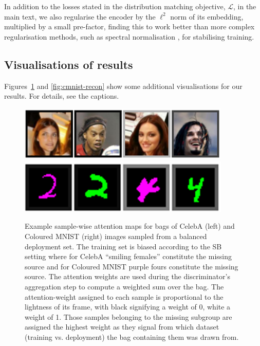 In addition to the losses stated in the distribution matching objective, $\mathcal{L}$, in the main text, we also regularise the encoder by the $\ell^2$ norm of its embedding, multiplied by a small pre-factor, finding this to work better than more complex regularisation methods, such as spectral normalisation \citep{miyato2018spectral}, for stabilising training.

\subsection{Visualisations of results}\label{sec:qual-results}
Figures~\ref{fig:attn_maps} and \ref{fig:cmnist-recon} show some additional visualisations for our results.
For details, see the captions.
\begin{figure}[tb]
  \centering
    \includegraphics[width=0.9\textwidth]{paper3/figures/celeba_attn_map.png}
    \includegraphics[width=0.9\textwidth]{paper3/figures/cmnist_attn_map.png}
  \caption{
    Example sample-wise attention maps for bags of CelebA (left) and Coloured MNIST (right) images sampled from a balanced deployment set. The training set is biased according to the SB setting where for CelebA ``smiling females'' constitute the missing source and for Coloured MNIST {\color{purple}purple} fours constitute the missing source. The attention weights are used during the discriminator's aggregation step to compute a weighted sum over the bag. The attention-weight assigned to each sample is proportional to the lightness of its frame, with black signifying a weight of 0, white a weight of 1. Those samples belonging to the missing subgroup are assigned the highest weight as they signal from which dataset (training vs. deployment) the bag containing them was drawn from.
  }%
  \label{fig:attn_maps}
\end{figure}

